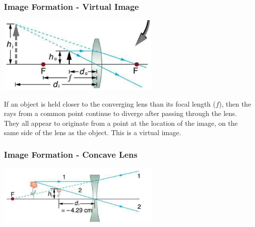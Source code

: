 \documentclass{beamer}
\begin{document}
\begin{frame}\frametitle{Image Formation - Virtual Image}

\begin{center}
\includegraphics[width=8cm]{fig/imageform4.jpg}
\end{center}

If an object is held closer to the converging lens than its focal length ($f$), then the rays from a common point continue to diverge after passing through the lens. They all appear to originate from a point at the location of the image, on the same side of the lens as the object. This is a virtual image. 


\end{frame}

\begin{frame}\frametitle{Image Formation - Concave Lens}

\begin{center}
\includegraphics[width=8cm]{fig/imageform5.jpg}
\end{center}
\end{frame}
\end{document}
